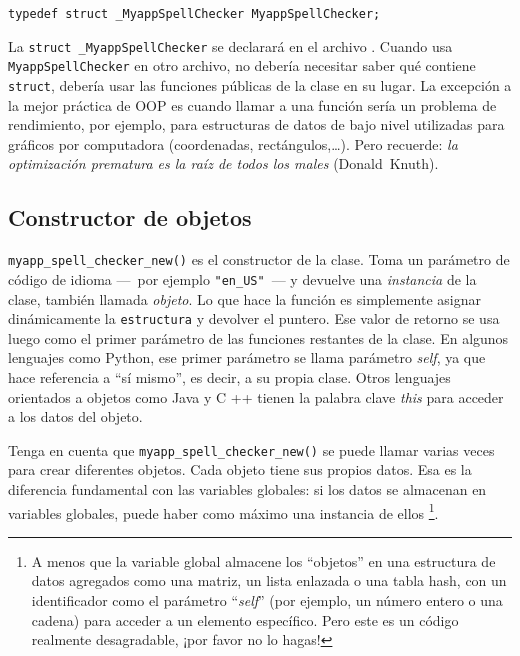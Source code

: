 \begin{lstlisting}[style=GLib/GTK]
typedef struct _MyappSpellChecker MyappSpellChecker;
\end{lstlisting}

La \lstinline{struct _MyappSpellChecker} se declarará en el archivo . Cuando usa \lstinline{MyappSpellChecker} en otro archivo, no debería necesitar saber qué contiene \lstinline{struct}, debería usar las funciones públicas de la clase en su lugar. La excepción a la mejor práctica de OOP es cuando llamar a una función sería un problema de rendimiento, por ejemplo, para estructuras de datos de bajo nivel utilizadas para gráficos por computadora (coordenadas, rectángulos,…). Pero recuerde: \emph{la optimización prematura es la raíz de todos los males} (Donald~Knuth).

\subsection{Constructor de objetos}
\lstinline{myapp_spell_checker_new()} es el constructor de la clase. Toma un parámetro de código de idioma ---~por ejemplo \lstinline{"en_US"}~--- y devuelve una \emph{instancia} de la clase, también llamada \emph{objeto}. Lo que hace la función es simplemente asignar dinámicamente la \lstinline{estructura} y devolver el puntero. Ese valor de retorno se usa luego como el primer parámetro de las funciones restantes de la clase. En algunos lenguajes como Python, ese primer parámetro se llama parámetro \emph{self}, ya que hace referencia a ``sí mismo'', es decir, a su propia clase. Otros lenguajes orientados a objetos como Java y C ++ tienen la palabra clave \emph{this} para acceder a los datos del objeto.

Tenga en cuenta que \lstinline{myapp_spell_checker_new()} se puede llamar varias veces para crear diferentes objetos. Cada objeto tiene sus propios datos. Esa es la diferencia fundamental con las variables globales: si los datos se almacenan en variables globales, puede haber como máximo una instancia de ellos \footnote{A menos que la variable global almacene los ``objetos'' en una estructura de datos agregados como una matriz, un lista enlazada o una tabla hash, con un identificador como el parámetro ``\emph{self}'' (por ejemplo, un número entero o una cadena) para acceder a un elemento específico. Pero este es un código realmente desagradable, ¡por favor no lo hagas!}.



